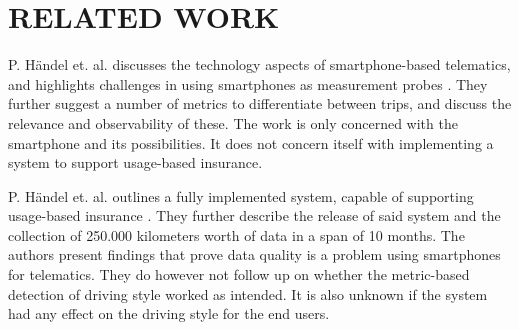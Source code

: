 \section{RELATED WORK}\label{sec:relatedwork}

P. Händel et. al. discusses the technology aspects of smartphone-based telematics, and highlights challenges in using smartphones as measurement probes \citep{art:insurtelematics}. They further suggest a number of metrics to differentiate between trips, and discuss the relevance and observability of these. The work is only concerned with the smartphone and its possibilities. It does not concern itself with implementing a system to support usage-based insurance.

P. Händel et. al. outlines a fully implemented system, capable of supporting usage-based insurance \citep{art:smartphones_for_monitoring_and_ubi}. They further describe the release of said system and the collection of 250.000 kilometers worth of data in a span of 10 months. The authors present findings that prove data quality is a problem using smartphones for telematics. They do however not follow up on whether the metric-based detection of driving style worked as intended. It is also unknown if the system had any effect on the driving style for the end users.